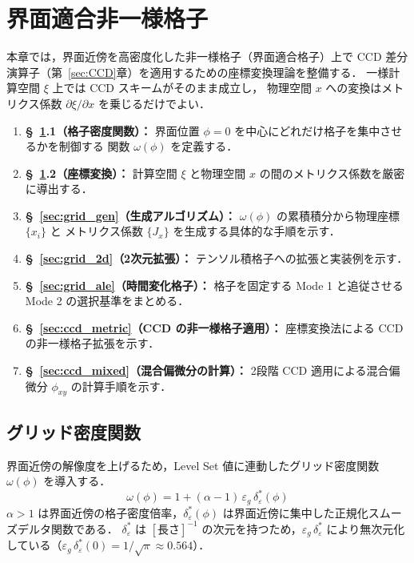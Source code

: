 \section{界面適合非一様格子}
\label{sec:grid}

本章では，界面近傍を高密度化した非一様格子（界面適合格子）上で
CCD 差分演算子（第~\ref{sec:CCD}章）を適用するための座標変換理論を整備する．
一様計算空間 $\xi$ 上では CCD スキームがそのまま成立し，
物理空間 $x$ への変換はメトリクス係数 $\partial\xi/\partial x$ を乗じるだけでよい．

\begin{enumerate}
  \item \textbf{§~\ref{sec:grid}.1（格子密度関数）：}
        界面位置 $\phi=0$ を中心にどれだけ格子を集中させるかを制御する
        関数 $\omega(\phi)$ を定義する．
  \item \textbf{§~\ref{sec:grid}.2（座標変換）：}
        計算空間 $\xi$ と物理空間 $x$ の間のメトリクス係数を厳密に導出する．
  \item \textbf{§~\ref{sec:grid_gen}（生成アルゴリズム）：}
        $\omega(\phi)$ の累積積分から物理座標 $\{x_i\}$ と
        メトリクス係数 $\{J_x\}$ を生成する具体的な手順を示す．
  \item \textbf{§~\ref{sec:grid_2d}（2次元拡張）：}
        テンソル積格子への拡張と実装例を示す．
  \item \textbf{§~\ref{sec:grid_ale}（時間変化格子）：}
        格子を固定する Mode 1 と追従させる Mode 2 の選択基準をまとめる．
  \item \textbf{§~\ref{sec:ccd_metric}（CCD の非一様格子適用）：}
        座標変換法による CCD の非一様格子拡張を示す．
  \item \textbf{§~\ref{sec:ccd_mixed}（混合偏微分の計算）：}
        2段階 CCD 適用による混合偏微分 $\phi_{xy}$ の計算手順を示す．
\end{enumerate}

\subsection{グリッド密度関数}

界面近傍の解像度を上げるため，Level Set 値に連動したグリッド密度関数 $\omega(\phi)$ を導入する．
\begin{equation}
  \omega(\phi) = 1 + (\alpha - 1)\,\varepsilon_g\,\delta_\varepsilon^*(\phi)
\end{equation}
$\alpha > 1$ は界面近傍の格子密度倍率，$\delta_\varepsilon^*(\phi)$ は界面近傍に集中した正規化スムーズデルタ関数である．
$\delta_\varepsilon^*$ は $[\text{長さ}]^{-1}$ の次元を持つため，$\varepsilon_g\,\delta_\varepsilon^*$ により無次元化している（$\varepsilon_g\,\delta_\varepsilon^*(0) = 1/\sqrt{\pi} \approx 0.564$）．

